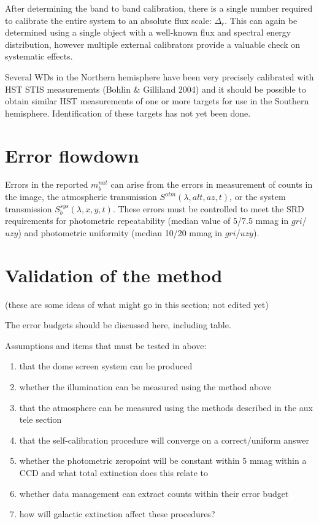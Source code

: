\documentclass[12pt,preprint]{aastex}
\begin{document}
After determining the band to band calibration, there is a single
number required to calibrate the entire system to an absolute flux
scale: $\Delta_r$.  This can again be determined using a single
object with a well-known flux and spectral energy distribution,
however multiple external calibrators provide a valuable check on
systematic effects. 

Several WDs in the Northern hemisphere have been very precisely
calibrated with HST STIS measurements (Bohlin \& Gilliland 2004) and
it should be possible to obtain similar HST measurements of one or
more targets for use in the Southern hemisphere. Identification of
these targets has not yet been done. 

\section{Error flowdown}
\label{sec:error}

Errors in the reported $m_b^{nat}$ can arise from the errors in
measurement of counts in the image, the atmospheric transmission
$S^{atm}(\lambda,alt,az,t)$, or the system transmission
$S_b^{sys}(\lambda,x,y,t)$.  These errors must be controlled to meet
the SRD requirements for photometric repeatability (median value of
5/7.5 mmag in $gri$/$uzy$) and photometric uniformity (median 10/20
mmag in $gri$/$uzy$).





\section{Validation of the method}
\label{sec:validate}

(these are some ideas of what might go in this section; not edited yet)

The error budgets should be discussed here, including table.

Assumptions and items that must be tested in above: 
\begin{enumerate}
\item{that the dome screen system can be produced}
\item{whether the illumination can be measured using the method above}
\item{that the atmosphere can be measured using the methods described
    in the aux tele section}
\item{that the self-calibration procedure will converge on a
    correct/uniform answer}
\item{whether the photometric zeropoint will be constant within 5 mmag 
    within a CCD and what total extinction does this relate to}
\item{whether data management can extract counts within their error
    budget}
\item{how will galactic extinction affect these procedures?}
\end{enumerate}
\end{document}
